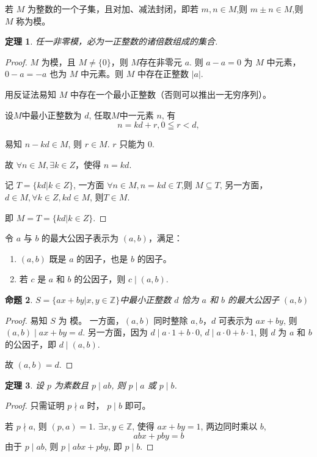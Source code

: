 \documentclass[11pt]{ctexart}
\newtheorem{theorem}{\indent 定理}[section]
\newtheorem{proposition}[theorem]{\indent 命题}
\begin{document}
若 $M$ 为整数的一个子集，且对加、减法封闭，即若 $m,n \in M$,则 $m \pm n \in M$,则 $M$ 称为模。
\begin{theorem}
    任一非零模，必为一正整数的诸倍数组成的集合.
\end{theorem}
\begin{proof}
    $M$ 为模，且 $M \neq \{0\}$，则 $M$存在非零元 $a$. 则 $a - a = 0 $ 为 $M$ 中元素，$0 - a = -a$ 也为 $M$ 中元素。则 $M$ 中存在正整数 $|a|$.

    用反证法易知 $M$ 中存在一个最小正整数（否则可以推出一无穷序列）。

    设$M$中最小正整数为 $d$, 任取$M$中一元素 $n$, 有
    \[
        n = kd + r, 0 \leqq r < d,
    \]

    易知 $n-kd \in M$, 则 $r \in M$. $r$ 只能为 $0$.

    故 $\forall n \in M, \exists k \in Z $，使得 $n = kd$.

    记 $T = \{kd|k \in Z\}$, 一方面 $\forall n \in M, n = kd \in T$,则 $M \subseteq T$, 另一方面，$d \in M, \forall k \in Z, kd \in M$, 则$T \in M$.

    即 $M = T = \{kd|k \in Z\}$.
\end{proof}

令 $a$ 与 $b$ 的最大公因子表示为 $(a,b)$，满足：
\begin{enumerate}
    \item $(a,b)$ 既是 $a$ 的因子，也是 $b$ 的因子。
    \item 若 $c$ 是 $a$ 和 $b$ 的公因子，则 $c \mid (a,b)$.
\end{enumerate}

\begin{proposition}
    $S = \{ ax + by | x,y \in \mathbb{Z} \}$中最小正整数 $d$ 恰为 $a$ 和 $b$ 的最大公因子 $(a,b)$
\end{proposition}

\begin{proof}
    易知 $S$ 为 模。
    一方面，$(a,b)$ 同时整除 $a,b$，$d$ 可表示为 $ax+by$, 则 $(a,b) \mid ax + by = d$.
    另一方面，因为 $d \mid a \cdot 1 + b \cdot 0$, $d \mid a \cdot 0 + b \cdot 1$, 则 $d$ 为 $a$ 和 $b$ 的公因子，即 $d \mid (a,b)$.

    故 $(a,b) = d$.
\end{proof}

\begin{theorem}
    设 $p$ 为素数且 $p \mid ab$, 则 $p \mid a$ 或 $p \mid b$.
\end{theorem}

\begin{proof}
    只需证明 $p \nmid a$ 时， $p \mid b$ 即可。

    若 $p \nmid a$, 则 $(p,a) = 1$. $\exists x,y \in \mathbb{Z}$, 使得 $ax+by=1$, 两边同时乘以 $b$,
    \[abx+pby=b\]
    由于 $p \mid ab$, 则 $p \mid abx + pby$, 即 $p \mid b$.
\end{proof}
\end{document}
